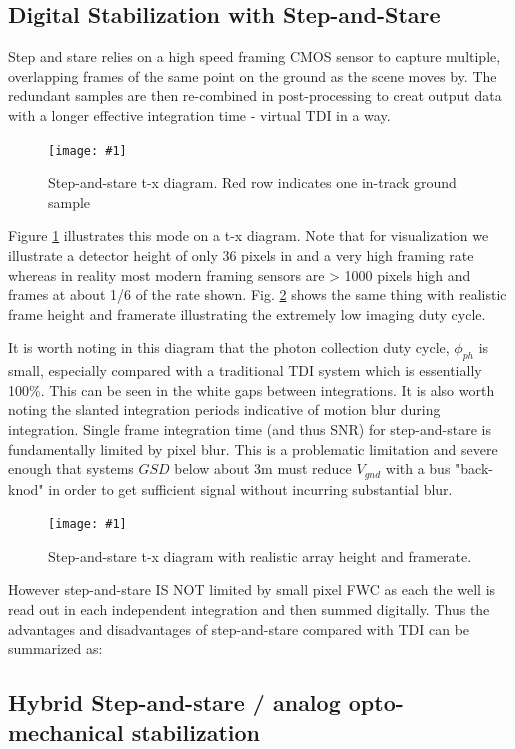 \documentclass[10pt,journal]{IEEEtran}  %
\newcommand{\includefigure}[3]
{
  \begin{figure}[h!]
  \centering
  \texttt{[image: \#1]}
  \caption[]{#3}
  \label{#2}
  \end{figure}
}
\begin{document}
\subsection{Digital Stabilization with Step-and-Stare}
Step and stare relies on a high speed framing CMOS sensor to capture multiple, overlapping frames of the same point on the ground as the scene moves by.  The redundant samples are then re-combined in post-processing to creat output data with a longer effective integration time - virtual TDI in a way.

\includefigure{figures/step_stare.pgf}{fig:step_stare}{Step-and-stare t-x diagram.  Red row indicates one in-track ground sample}

Figure \ref{fig:step_stare} illustrates this mode on a t-x diagram.  Note that for visualization we illustrate a detector height of only 36 pixels in and a very high framing rate whereas in reality most modern framing sensors are > 1000 pixels high and frames at about 1/6 of the rate shown.  Fig. \ref{fig:step_stare_real} shows the same thing with realistic frame height and framerate illustrating the extremely low imaging duty cycle.

It is worth noting in this diagram that the photon collection duty cycle, $\phi_{ph}$ is small, especially compared with a traditional TDI system which is essentially 100\%.  This can be seen in the white gaps between integrations.  It is also worth noting the slanted integration periods indicative of motion blur during integration.  Single frame integration time (and thus SNR) for step-and-stare is fundamentally limited by pixel blur.  This is a problematic limitation and severe enough that systems $GSD$ below about 3m must reduce $V_{gnd}$ with a bus "back-knod" in order to get sufficient signal without incurring substantial blur.

\includefigure{figures/step_stare_real.pgf}{fig:step_stare_real}{Step-and-stare t-x diagram with realistic array height and framerate.}

However step-and-stare IS NOT limited by small pixel FWC as each the well is read out in each independent integration and then summed digitally.  Thus the advantages and disadvantages of step-and-stare compared with TDI can be summarized as:


\subsection{Hybrid Step-and-stare / analog opto-mechanical stabilization}
\end{document}
